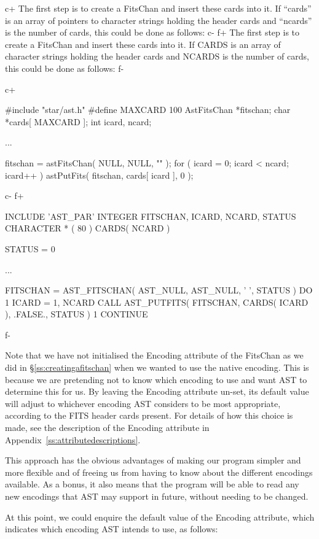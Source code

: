 \documentclass[twoside,11pt]{starlink}
\providecommand{\appref}[1]{Appendix~\ref{#1}}
\providecommand{\secref}[1]{\S\ref{#1}}
\begin{document}
c+
The first step is to create a FitsChan and insert these cards into
it. If ``cards'' is an array of pointers to character strings holding
the header cards and ``ncards'' is the number of cards, this could be
done as follows:
c-
f+
The first step is to create a FitsChan and insert these cards into
it. If CARDS is an array of character strings holding the header cards
and NCARDS is the number of cards, this could be done as follows:
f-

c+
\small
\begin{terminalv}
#include "star/ast.h"
#define MAXCARD 100
AstFitsChan *fitschan;
char *cards[ MAXCARD ];
int icard, ncard;

...

fitschan = astFitsChan( NULL, NULL, "" );
for ( icard = 0; icard < ncard; icard++ ) astPutFits( fitschan, cards[ icard ], 0 );
\end{terminalv}
\normalsize
c-
f+
\small
\begin{terminalv}
      INCLUDE 'AST_PAR'
      INTEGER FITSCHAN, ICARD, NCARD, STATUS
      CHARACTER * ( 80 ) CARDS( NCARD )

      STATUS = 0

      ...

      FITSCHAN = AST_FITSCHAN( AST_NULL, AST_NULL, ' ', STATUS )
      DO 1 ICARD = 1, NCARD
         CALL AST_PUTFITS( FITSCHAN, CARDS( ICARD ), .FALSE., STATUS )
 1    CONTINUE
\end{terminalv}
\normalsize
f-

Note that we have not initialised the Encoding attribute of the
FitsChan as we did in \secref{ss:creatingafitschan} when we wanted to
use the native encoding. This is because we are pretending not to know
which encoding to use and want AST to determine this for us. By
leaving the Encoding attribute un-set, its default value will adjust
to whichever encoding AST considers to be most appropriate, according
to the FITS header cards present. For details of how this choice is
made, see the description of the Encoding attribute in
\appref{ss:attributedescriptions}.

This approach has the obvious advantages of making our program simpler
and more flexible and of freeing us from having to know about the
different encodings available. As a bonus, it also means that the
program will be able to read any new encodings that AST may support in
future, without needing to be changed.

At this point, we could enquire the default value of the Encoding
attribute, which indicates which encoding AST intends to use, as
follows:
\end{document}
